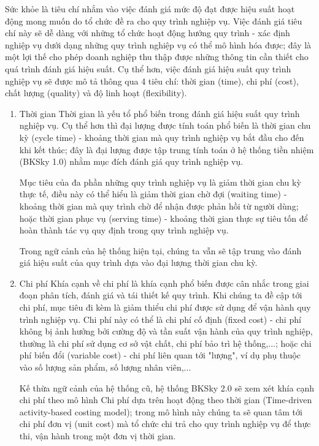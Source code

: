 Sức khỏe là tiêu chí nhắm vào việc đánh giá mức độ đạt được hiệu suất hoạt động mong muốn do tổ chức đề ra cho quy trình nghiệp vụ. Việc đánh giá tiêu chí này sẽ dễ dàng với những tổ chức hoạt động hướng quy trình - xác định nghiệp vụ dưới dạng những quy trình nghiệp vụ có thể mô hình hóa được; đây là một lợi thế cho phép doanh nghiệp thu thập được những thông tin cần thiết cho quá trình đánh giá hiệu suất. Cụ thể hơn, việc đánh giá hiệu suất quy trình nghiệp vụ sẽ được mô tả thông qua 4 tiêu chí: thời gian (time), chi phí (cost), chất lượng (quality) và độ linh hoạt (flexibility).
    \begin{enumerate}[label=(\alph*)]
        \item Thời gian
        \newline
    Thời gian là yếu tổ phổ biến trong đánh giá hiệu suất quy trình nghiệp vụ. Cụ thể hơn thì đại lượng được tính toán phổ biến là thời gian chu kỳ (cycle time) - khoảng thời gian mà quy trình nghiệp vụ bắt đầu cho đến khi kết thúc; đây là đại lượng được tập trung tính toán ở hệ thống tiền nhiệm (BKSky 1.0) nhằm mục đích đánh giá quy trình nghiệp vụ. 
    
    Mục tiêu của đa phần những quy trình nghiệp vụ là giảm thời gian chu kỳ thực tế, điều này có thể hiểu là giảm thời gian chờ đợi (waiting time) - khoảng thời gian mà quy trình chờ để nhận được phản hồi từ người dùng; hoặc thời gian phục vụ (serving time) - khoảng thời gian thực sự tiêu tốn để hoàn thành tác vụ quy định trong quy trình nghiệp vụ.

    Trong ngữ cảnh của hệ thống hiện tại, chúng ta vẫn sẽ tập trung vào đánh giá hiệu suất của quy trình dựa vào đại lượng thời gian chu kỳ.
    
        \item Chi phí
        \newline
    Khía cạnh về chi phí là khía cạnh phổ biến được cân nhắc trong giai đoạn phân tích, đánh giá và tái thiết kế quy trình. Khi chúng ta đề cập tới chi phí, mục tiêu đi kèm là giảm thiểu chi phí được sử dụng để vận hành quy trình nghiệp vụ. Chi phí này có thể là chi phí cố định (fixed cost) - chi phí không bị ảnh hưởng bởi cường độ và tần suất vận hành của quy trình nghiệp, thường là chi phí sử dụng cơ sở vật chất, chi phí bảo trì hệ thống,...; hoặc chi phí biến đổi (variable cost) - chi phí liên quan tới "lượng", ví dụ phụ thuộc vào số lượng sản phẩm, số lượng nhân viên,...
    
    Kế thừa ngữ cảnh của hệ thống cũ, hệ thống BKSky 2.0 sẽ xem xét khía cạnh chi phí theo mô hình Chi phí dựa trên hoạt động theo thời gian (Time-driven activity-based costing model); trong mô hình này chúng ta sẽ quan tâm tới chi phí đơn vị (unit cost) mà tổ chức chi trả cho quy trình nghiệp vụ để thực thi, vận hành trong một đơn vị thời gian.
    

\end{enumerate}
